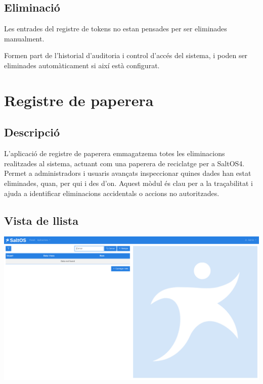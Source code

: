 \documentclass[a4paper]{article}
\begin{document}
\hypertarget{toc30}{}
\subsection{Eliminació}

Les entrades del registre de tokens no estan pensades per ser eliminades manualment.

Formen part de l'historial d'auditoria i control d'accés del sistema, i poden ser eliminades automàticament si així està configurat.


\hypertarget{toc31}{}
\section{Registre de paperera}

\hypertarget{toc32}{}
\subsection{Descripció}

L'aplicació de registre de paperera emmagatzema totes les eliminacions realitzades al sistema, actuant com una paperera de reciclatge per a SaltOS4.
Permet a administradors i usuaris avançats inspeccionar quines dades han estat eliminades, quan, per qui i des d'on.
Aquest mòdul és clau per a la traçabilitat i ajuda a identificar eliminacions accidentals o accions no autoritzades.

\hypertarget{toc33}{}
\subsection{Vista de llista}

\begin{center}\includegraphics[width=1\textwidth]{../ujest/snaps/test-screenshots-js-screenshots-common-trashlog-list-ca-es-1-snap.png}\end{center}
\end{document}
